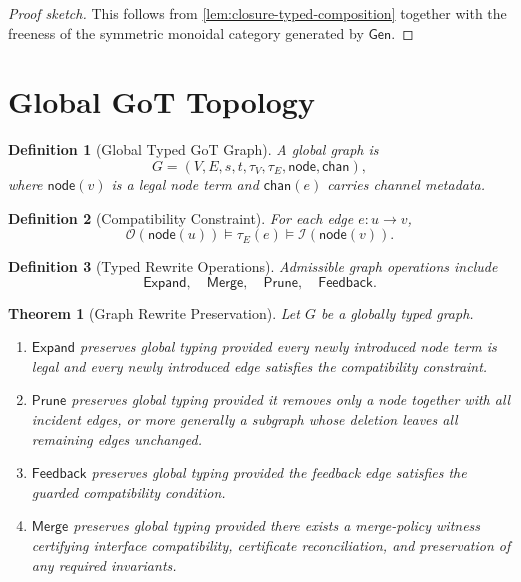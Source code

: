\documentclass[11pt]{article}
\newtheorem{definition}{Definition}[section]
\newtheorem{theorem}{Theorem}[section]
\theoremstyle{remark}
\begin{document}
\begin{proof}[Proof sketch]
This follows from \cref{lem:closure-typed-composition} together with the freeness of the symmetric monoidal category generated by \(\mathsf{Gen}\).
\end{proof}
\newpage
\section{Global GoT Topology}

\begin{definition}[Global Typed GoT Graph]
A global graph is
\[
G=(V,E,s,t,\tau_V,\tau_E,\mathsf{node},\mathsf{chan}),
\]
where \(\mathsf{node}(v)\) is a legal node term and \(\mathsf{chan}(e)\) carries channel metadata.
\end{definition}

\begin{definition}[Compatibility Constraint]
For each edge \(e:u\to v\),
\[
\mathcal{O}(\mathsf{node}(u)) \models \tau_E(e) \models \mathcal{I}(\mathsf{node}(v)).
\]
\end{definition}

\begin{definition}[Typed Rewrite Operations]
Admissible graph operations include
\[
\mathsf{Expand},\quad \mathsf{Merge},\quad \mathsf{Prune},\quad \mathsf{Feedback}.
\]
\end{definition}

\begin{theorem}[Graph Rewrite Preservation]\label{thm:graph-rewrite-preservation}
Let \(G\) be a globally typed graph.
\begin{enumerate}
    \item \(\mathsf{Expand}\) preserves global typing provided every newly introduced node term is legal and every newly introduced edge satisfies the compatibility constraint.
    \item \(\mathsf{Prune}\) preserves global typing provided it removes only a node together with all incident edges, or more generally a subgraph whose deletion leaves all remaining edges unchanged.
    \item \(\mathsf{Feedback}\) preserves global typing provided the feedback edge satisfies the guarded compatibility condition.
    \item \(\mathsf{Merge}\) preserves global typing provided there exists a merge-policy witness certifying interface compatibility, certificate reconciliation, and preservation of any required invariants.
\end{enumerate}
\end{theorem}
\end{document}
